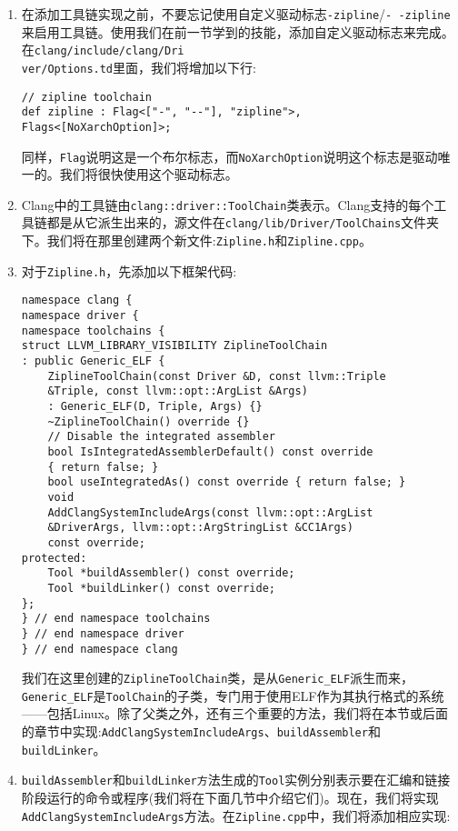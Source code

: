 \begin{enumerate}
\item 在添加工具链实现之前，不要忘记使用自定义驱动标志\texttt{-zipline}/\texttt{-\,-zipline}来启用工具链。使用我们在前一节学到的技能，添加自定义驱动标志来完成。在\texttt{clang/include/clang/Dri\\ver/Options.td}里面，我们将增加以下行:

\begin{lstlisting}[style=styleJavaScript]
// zipline toolchain
def zipline : Flag<["-", "--"], "zipline">,
Flags<[NoXarchOption]>;
\end{lstlisting}

同样，\texttt{Flag}说明这是一个布尔标志，而\texttt{NoXarchOption}说明这个标志是驱动唯一的。我们将很快使用这个驱动标志。

\item Clang中的工具链由\texttt{clang::driver::ToolChain}类表示。Clang支持的每个工具链都是从它派生出来的，源文件在\texttt{clang/lib/Driver/ToolChains}文件夹下。我们将在那里创建两个新文件:\texttt{Zipline.h}和\texttt{Zipline.cpp}。

\item 对于\texttt{Zipline.h}，先添加以下框架代码:

\begin{lstlisting}[style=styleCXX]
namespace clang {
namespace driver {
namespace toolchains {
struct LLVM_LIBRARY_VISIBILITY ZiplineToolChain
: public Generic_ELF {
	ZiplineToolChain(const Driver &D, const llvm::Triple
	&Triple, const llvm::opt::ArgList &Args)
	: Generic_ELF(D, Triple, Args) {}
	~ZiplineToolChain() override {}
	// Disable the integrated assembler
	bool IsIntegratedAssemblerDefault() const override
	{ return false; }
	bool useIntegratedAs() const override { return false; }
	void
	AddClangSystemIncludeArgs(const llvm::opt::ArgList
	&DriverArgs, llvm::opt::ArgStringList &CC1Args)
	const override;
protected:
	Tool *buildAssembler() const override;
	Tool *buildLinker() const override;
};
} // end namespace toolchains
} // end namespace driver
} // end namespace clang
\end{lstlisting}

我们在这里创建的\texttt{ZiplineToolChain}类，是从\texttt{Generic\_ELF}派生而来，\texttt{Generic\_ELF}是\texttt{ToolChain}的子类，专门用于使用ELF作为其执行格式的系统——包括Linux。除了父类之外，还有三个重要的方法，我们将在本节或后面的章节中实现:\texttt{AddClangSystemIncludeArgs}、\texttt{buildAssembler}和\texttt{buildLinker}。

\item \texttt{buildAssembler}和\texttt{buildLinker方}法生成的\texttt{Tool}实例分别表示要在汇编和链接阶段运行的命令或程序(我们将在下面几节中介绍它们)。现在，我们将实现\texttt{AddClangSystemIncludeArgs}方法。在\texttt{Zipline.cpp}中，我们将添加相应实现:


\end{enumerate}
